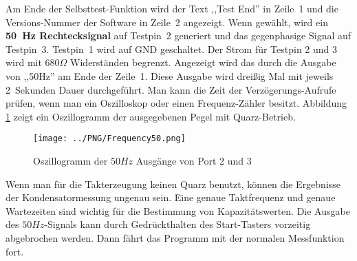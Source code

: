 
Am Ende der Selbsttest-Funktion wird der Text ,,Test End'' in Zeile~1 und die Versions-Nummer der Software in Zeile~2 angezeigt.
Wenn gewählt, wird ein \textbf {50~Hz Rechtecksignal} auf Testpin~2 generiert und das gegenphasige Signal auf Testpin~3.
Testpin~1 wird auf GND geschaltet. Der Strom für Testpin 2 und 3 wird mit \(680\Omega\) Widerständen begrenzt.
Angezeigt wird das durch die Ausgabe von ,,50Hz'' am Ende der Zeile~1.
Diese Ausgabe wird dreißig Mal mit jeweils 2~Sekunden Dauer durchgeführt.
Man kann die Zeit der Verzögerungs-Aufrufe prüfen, wenn man ein Oszilloskop oder einen
Frequenz-Zähler besitzt. Abbildung \ref{fig:Frequency50} zeigt ein Oszillogramm der ausgegebenen Pegel mit Quarz-Betrieb.

\begin{figure}[H]
\centering
\texttt{[image: ../PNG/Frequency50.png]}
\caption{Oszillogramm der \(50Hz\) Ausgänge von Port 2 und 3}
\label{fig:Frequency50}
\end{figure}

Wenn man für die Takterzeugung keinen Quarz benutzt, können die
Ergebnisse der Kondensatormessung ungenau sein.
Eine genaue Taktfrequenz und genaue Wartezeiten sind wichtig für die Bestimmung von Kapazitätswerten.
Die Ausgabe des \(50Hz\)-Signals kann durch Gedrückthalten des Start-Tasters vorzeitig abgebrochen werden.
Dann fährt das Programm mit der normalen Messfunktion fort.

